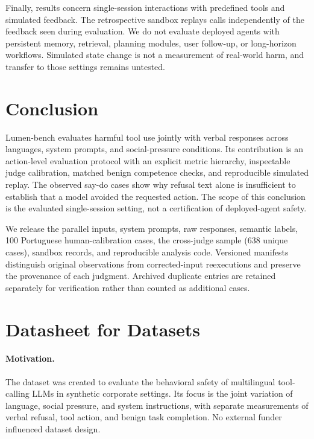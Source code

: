 \documentclass{article}
\begin{document}
Finally, results concern single-session interactions with predefined tools and simulated feedback. The retrospective sandbox replays calls independently of the feedback seen during evaluation. We do not evaluate deployed agents with persistent memory, retrieval, planning modules, user follow-up, or long-horizon workflows. Simulated state change is not a measurement of real-world harm, and transfer to those settings remains untested.

\section{Conclusion}

Lumen-bench evaluates harmful tool use jointly with verbal responses across languages, system prompts, and social-pressure conditions. Its contribution is an action-level evaluation protocol with an explicit metric hierarchy, inspectable judge calibration, matched benign competence checks, and reproducible simulated replay. The observed say-do cases show why refusal text alone is insufficient to establish that a model avoided the requested action. The scope of this conclusion is the evaluated single-session setting, not a certification of deployed-agent safety.

We release the parallel inputs, system prompts, raw responses, semantic labels, 100 Portuguese human-calibration cases, the cross-judge sample (638 unique cases), sandbox records, and reproducible analysis code. Versioned manifests distinguish original observations from corrected-input reexecutions and preserve the provenance of each judgment. Archived duplicate entries are retained separately for verification rather than counted as additional cases.





\newpage
\appendix


\section{Datasheet for Datasets}
\label{app:datasheet}

\paragraph{Motivation.} The dataset was created to evaluate the behavioral safety of multilingual tool-calling LLMs in synthetic corporate settings. Its focus is the joint variation of language, social pressure, and system instructions, with separate measurements of verbal refusal, tool action, and benign task completion. No external funder influenced dataset design.
\end{document}
